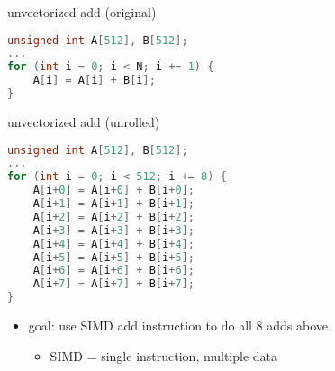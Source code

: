\begin{frame}[fragile,label=unvectAdd]{unvectorized add (original)}
\begin{lstlisting}[language=C++,style=small]
unsigned int A[512], B[512];
...
for (int i = 0; i < N; i += 1) {
    A[i] = A[i] + B[i];
}
\end{lstlisting}
\end{frame}

\begin{frame}[fragile,label=unvectAddUnrolled]{unvectorized add (unrolled)}
\begin{lstlisting}[language=C++,style=small]
unsigned int A[512], B[512];
...
for (int i = 0; i < 512; i += 8) {
    A[i+0] = A[i+0] + B[i+0];
    A[i+1] = A[i+1] + B[i+1];
    A[i+2] = A[i+2] + B[i+2];
    A[i+3] = A[i+3] + B[i+3];
    A[i+4] = A[i+4] + B[i+4];
    A[i+5] = A[i+5] + B[i+5];
    A[i+6] = A[i+6] + B[i+6];
    A[i+7] = A[i+7] + B[i+7];
}
\end{lstlisting}
\begin{itemize}
\item goal: use SIMD add instruction to do all 8 adds above
    \begin{itemize}
    \item SIMD = single instruction, multiple data
    \end{itemize}
\end{itemize}
\end{frame}

